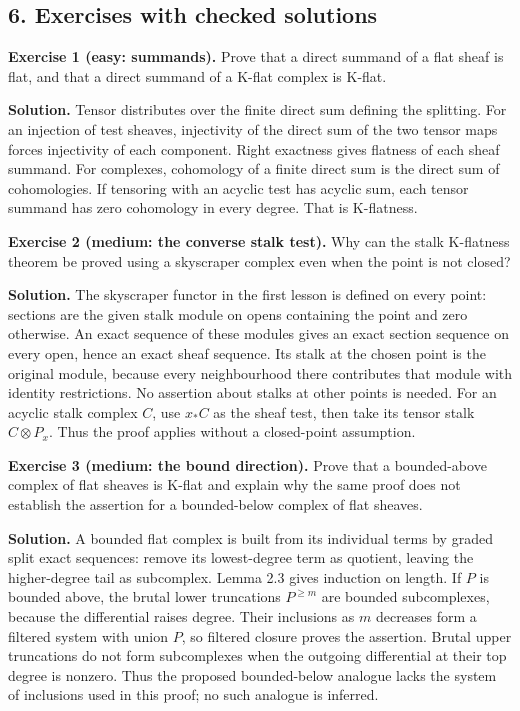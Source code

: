 \documentclass[
  english,
  11pt,
  a4paper,
]{article}
\begin{document}
\subsection{6. Exercises with checked
solutions}\label{flat-modules-and-k-flat-resolutions--6-exercises-with-checked-solutions}

\textbf{Exercise 1 (easy: summands).} Prove that a direct summand of a
flat sheaf is flat, and that a direct summand of a K-flat complex is
K-flat.

\textbf{Solution.} Tensor distributes over the finite direct sum
defining the splitting. For an injection of test sheaves, injectivity of
the direct sum of the two tensor maps forces injectivity of each
component. Right exactness gives flatness of each sheaf summand. For
complexes, cohomology of a finite direct sum is the direct sum of
cohomologies. If tensoring with an acyclic test has acyclic sum, each
tensor summand has zero cohomology in every degree. That is K-flatness.

\textbf{Exercise 2 (medium: the converse stalk test).} Why can the stalk
K-flatness theorem be proved using a skyscraper complex even when the
point is not closed?

\textbf{Solution.} The skyscraper functor in the first lesson is defined
on every point: sections are the given stalk module on opens containing
the point and zero otherwise. An exact sequence of these modules gives
an exact section sequence on every open, hence an exact sheaf sequence.
Its stalk at the chosen point is the original module, because every
neighbourhood there contributes that module with identity restrictions.
No assertion about stalks at other points is needed. For an acyclic
stalk complex \(C\), use \(x_*C\) as the sheaf test, then take its
tensor stalk \(C\otimes P_x\). Thus the proof applies without a
closed-point assumption.

\textbf{Exercise 3 (medium: the bound direction).} Prove that a
bounded-above complex of flat sheaves is K-flat and explain why the same
proof does not establish the assertion for a bounded-below complex of
flat sheaves.

\textbf{Solution.} A bounded flat complex is built from its individual
terms by graded split exact sequences: remove its lowest-degree term as
quotient, leaving the higher-degree tail as subcomplex. Lemma 2.3 gives
induction on length. If \(P\) is bounded above, the brutal lower
truncations \(P^{\ge m}\) are bounded subcomplexes, because the
differential raises degree. Their inclusions as \(m\) decreases form a
filtered system with union \(P\), so filtered closure proves the
assertion. Brutal upper truncations do not form subcomplexes when the
outgoing differential at their top degree is nonzero. Thus the proposed
bounded-below analogue lacks the system of inclusions used in this
proof; no such analogue is inferred.
\end{document}
